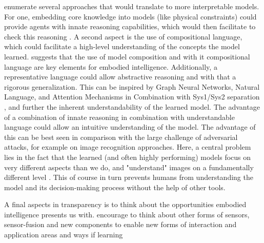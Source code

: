 \documentclass[twoside,11pt]{article}
\begin{document}
\citet{RoyEtAl:2021:RLRoboticsChallenges} enumerate several approaches that would translate to more interpretable models. For one, embedding core knowledge into models (like physical constraints) could provide agents with innate reasoning capabilities, which would then facilitate to check this reasoning \cite{HaSchmidhuber:2018:CoreKnowledgeWorldModels}. A second aspect is the use of compositional language, which could facilitate a high-level understanding of the concepts the model learned. \cite{Koditschek:2021:RoboticsCompositionalLanguage} suggests that the use of model composition and with it compositional language are key elements for embodied intelligence.
Additionally, a representative language could allow abstractive reasoning and with that a rigorous generalization. This can be inspired by Graph Neural Networks, Natural Language, and Attention Mechanisms in Combination with Sys1/Sys2 separation \cite{RoyEtAl:2021:RLRoboticsChallenges}, and further the inherent understandability of the learned model.
The advantage of a combination of innate reasoning in combination with understandable language could allow an intuitive understanding of the model. The advantage of this can be best seen in comparison with the large challenge of adversarial attacks, for example on image recognition approaches. Here, a central problem lies in the fact that the learned (and often highly performing) models focus on very different aspects than we do, and "understand" images on a fundamentally different level \cite{ChakrabortyEtAl:2021:SurveyAdversarialAttacks}. This of course in turn prevents humans from understanding the model and its decision-making process without the help of other tools.

A final aspects in transparency is to think about the opportunities embodied intelligence presents us with. \citet{RoyEtAl:2021:RLRoboticsChallenges} encourage to think about other forms of sensors, sensor-fusion and new components to enable new forms of interaction and application areas and ways if learning
\end{document}

